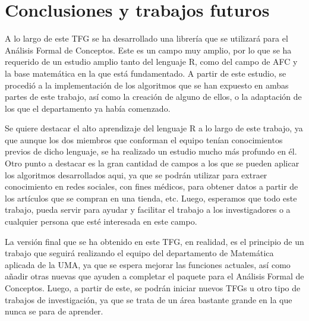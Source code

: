 \section{Conclusiones y trabajos futuros}

A lo largo de este TFG se ha desarrollado una librer\'ia que se utilizar\'a para el An\'alisis Formal de Conceptos. Este es un 
campo muy amplio, por lo que se ha requerido de un estudio amplio tanto del lenguaje R, como del campo de AFC y la base matem\'atica en la que 
est\'a fundamentado. A partir de este estudio, se procedi\'o a la implementaci\'on de los algoritmos que se han expuesto en ambas partes de 
este trabajo, as\'i como la creaci\'on de alguno de ellos, o la adaptaci\'on de los que el departamento ya hab\'ia comenzado.

Se quiere destacar el alto aprendizaje del lenguaje R a lo largo de este trabajo, ya que aunque los dos miembros que conforman el equipo ten\'ian 
conocimientos previos de dicho lenguaje, se ha realizado un estudio mucho m\'as profundo en \'el.
Otro punto a destacar es la gran cantidad de campos a los que se pueden aplicar los algoritmos desarrollados aqui, ya que se podr\'an 
utilizar para extraer conocimiento en redes sociales, con fines m\'edicos, para obtener datos a partir de los art\'iculos que se compran 
en una tienda, etc. Luego, esperamos que todo este trabajo, pueda servir para ayudar y facilitar el trabajo a los investigadores o a cualquier persona 
que est\'e interesada en este campo.

La versi\'on final que se ha obtenido en este TFG, en realidad, es el principio de un trabajo que seguir\'a realizando el equipo del 
departamento de Matem\'atica aplicada de la UMA, ya que se espera mejorar las funciones actuales, as\'i como a\~nadir otras nuevas 
que ayuden a completar el paquete para el An\'alisis Formal de Conceptos. Luego, a partir de este, se podr\'an iniciar nuevos TFGs u otro 
tipo de trabajos de investigaci\'on, ya que se trata de un \'area bastante grande en la que nunca se para de aprender.

\newpage
\thispagestyle{empty}
\mbox{}
\newpage